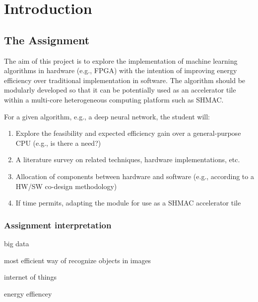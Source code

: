 \chapter{Introduction}


\section{The Assignment}
The aim of this project is to explore the implementation of machine learning algorithms in hardware (e.g., FPGA) with the intention of improving energy efficiency over traditional implementation in software. The algorithm should be modularly developed so that it can be potentially used as an accelerator tile within a multi-core heterogeneous computing platform such as SHMAC.

For a given algorithm, e.g., a deep neural network, the student will:

\begin{enumerate}
	
	\item Explore the feasibility and expected efficiency gain over a general-purpose CPU (e.g., is there a need?)
	
	\item A literature survey on related techniques, hardware implementations, etc.
	
	\item Allocation of components between hardware and software (e.g., according to a HW/SW co-design methodology)
	
	\item If time permits, adapting the module for use as a SHMAC accelerator tile
	
\end{enumerate}

\subsection{Assignment interpretation}



big data

most efficient way of recognize objects in images

internet of things

energy effiencey